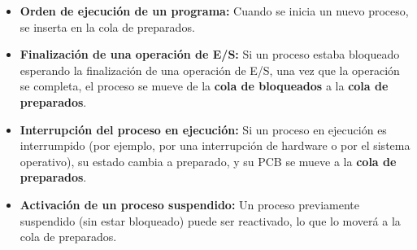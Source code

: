 \begin{tcolorbox}
\begin{itemize}
		\begin{itemize}
			\item \textbf{Orden de ejecución de un programa:} Cuando se inicia un nuevo proceso, se inserta en la cola de preparados.
			\item \textbf{Finalización de una operación de E/S:} Si un proceso estaba bloqueado esperando la finalización de una operación de E/S, una vez que la operación se completa, el proceso se mueve de la \textbf{cola de bloqueados} a la \textbf{cola de preparados}.
			\item \textbf{Interrupción del proceso en ejecución:} Si un proceso en ejecución es interrumpido (por ejemplo, por una interrupción de hardware o por el sistema operativo), su estado cambia a preparado, y su PCB se mueve a la \textbf{cola de preparados}.
			\item \textbf{Activación de un proceso suspendido:} Un proceso previamente suspendido (sin estar bloqueado) puede ser reactivado, lo que lo moverá a la cola de preparados.
		\end{itemize}
		

						\end{itemize}	
	\end{tcolorbox}	






